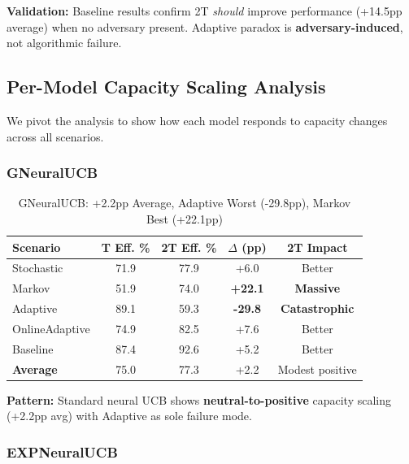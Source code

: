 \documentclass[11pt,a4paper]{article}
\newcommand{\critical}[1]{\textcolor{criticalcolor}{\textbf{#1}}}
\newcommand{\success}[1]{\textcolor{successcolor}{\textbf{#1}}}
\begin{document}
\vspace{-0.2cm}
\textbf{Validation:} Baseline results confirm 2T \textit{should} improve performance (+14.5pp average) when no adversary present. Adaptive paradox is \critical{adversary-induced}, not algorithmic failure.


\subsection{Per-Model Capacity Scaling Analysis}

We pivot the analysis to show how each model responds to capacity changes across all scenarios.

\subsubsection{GNeuralUCB}

\vspace{-0.4cm}
\begin{table}[H]
\scriptsize
\centering
\begin{tabular}{lcccc}
\toprule
\textbf{Scenario} & \textbf{T Eff. \%} & \textbf{2T Eff. \%} & \textbf{$\Delta$ (pp)} & \textbf{2T Impact} \\
\midrule
Stochastic & 71.9 & 77.9 & +6.0 & Better \\
Markov & 51.9 & 74.0 & \success{+22.1} & \success{Massive} \\
Adaptive & 89.1 & 59.3 & \critical{-29.8} & \critical{Catastrophic} \\
OnlineAdaptive & 74.9 & 82.5 & +7.6 & Better \\
Baseline & 87.4 & 92.6 & +5.2 & Better \\
\midrule
\textbf{Average} & 75.0 & 77.3 & +2.2 & Modest positive \\
\bottomrule
\end{tabular}
\vspace{-0.2cm}
\caption{GNeuralUCB: +2.2pp Average, Adaptive Worst (-29.8pp), Markov Best (+22.1pp)}
\end{table}

\vspace{-0.2cm}
\textbf{Pattern:} Standard neural UCB shows \textbf{neutral-to-positive} capacity scaling (+2.2pp avg) with Adaptive as sole failure mode.

\subsubsection{EXPNeuralUCB}
\end{document}
